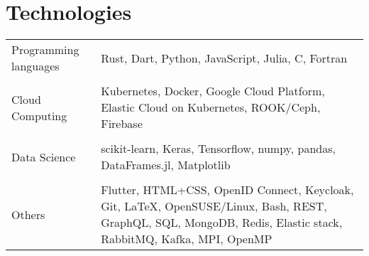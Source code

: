 \documentclass[10pt]{article}
\begin{document}
\section*{Technologies}

\begin{tabu} to \linewidth {lX}
Programming languages
& Rust, Dart, Python, JavaScript, Julia, C, Fortran \\
&\\
Cloud Computing
& Kubernetes, Docker, Google Cloud Platform, Elastic Cloud on
  Kubernetes, ROOK/Ceph, Firebase \\
&\\
Data Science
& scikit-learn, Keras, Tensorflow, numpy, pandas, DataFrames.jl,
  Matplotlib \\
&\\
Others
& Flutter, HTML+CSS, OpenID Connect, Keycloak, Git, {\LaTeX},
  OpenSUSE/Linux, Bash, REST, GraphQL, SQL, MongoDB, Redis, Elastic stack,
  RabbitMQ, Kafka, MPI, OpenMP \\
\end{tabu}
\end{document}
